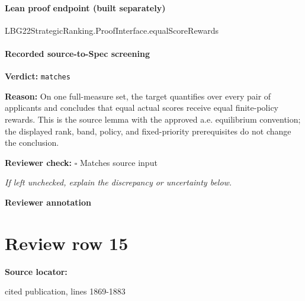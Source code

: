 \documentclass[10pt]{article}
\newcommand{\reviewerbox}{%
  \par\noindent\fbox{\parbox{0.96\linewidth}{\rule{0pt}{0.38in}}}\par
}
\newcommand{\reviewmatch}[1]{%
  \par\noindent\textbf{Reviewer check:} $\square$\; #1\par
  \noindent\emph{If left unchecked, explain the discrepancy or uncertainty below.}\par
}
\begin{document}
\paragraph{Lean proof endpoint (built separately)}\begin{ReviewVerbatim}
LBG22StrategicRanking.ProofInterface.equalScoreRewards
\end{ReviewVerbatim}

\paragraph{Recorded source-to-Spec screening}
\textbf{Verdict:} \texttt{matches}
\\
{\raggedright
\textbf{Reason:} On one full-\allowbreak{}measure set, the target quantifies over every pair of applicants and concludes that equal actual scores receive equal finite-\allowbreak{}policy rewards.\allowbreak{} This is the source lemma with the approved a.\allowbreak{}e.\allowbreak{} equilibrium convention;\allowbreak{} the displayed rank, band, policy, and fixed-\allowbreak{}priority prerequisites do not change the conclusion.\allowbreak{}
\par}
\reviewmatch{Matches source input}
\noindent\textbf{Reviewer annotation}\par
\reviewerbox
\clearpage
\hypertarget{source-claim-1693f763578ff49e}{}
\section*{Review row 15}
\textbf{Source locator:} {\footnotesize\raggedright cited publication, lines 1869-\allowbreak{}1883\par}
\end{document}
